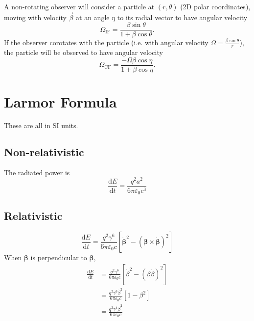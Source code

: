 \documentclass{book}
\newcommand{\deriv}[2]{\frac{\text{d}{#1}}{\text{d}{#2}}}
\begin{document}
A non-rotating observer will consider a particle at $(r,\theta)$ (2D polar coordinates), moving with velocity $\vec{\beta}$ at an angle $\eta$ to its radial vector to have angular velocity
\begin{equation}
    \Omega_\text{IF} = \frac{\beta\sin\theta}{1 + \beta\cos\theta}.
    \label{eqn:angular_rate_IF}
\end{equation}
If the observer corotates with the particle (i.e. with angular velocity $\Omega = \frac{\beta\sin\theta}{r}$), the particle will be observed to have angular velocity
\begin{equation}
    \Omega_\text{CF} = \frac{-\Omega\beta\cos\eta}{1+\beta\cos\eta}.
    \label{eqn:angular_rate_CF}
\end{equation}

\section{Larmor Formula}

These are all in SI units.

\subsection{Non-relativistic}

The radiated power is
\begin{equation}
    \deriv{E}{t} = \frac{q^2a^2}{6\pi\varepsilon_0 c^3}
\end{equation}

\subsection{Relativistic}

\begin{equation}
    \deriv{E}{t} = \frac{q^2\gamma^6}{6\pi\varepsilon_0 c}
        \left[\dot{\bm{\beta}}^2 - (\bm{\beta}\times\dot{\bm{\beta}})^2\right]
\end{equation}
When $\bm{\beta}$ is perpendicular to $\dot{\bm{\beta}}$,
\begin{equation}
\begin{aligned}
    \deriv{E}{t}
        &= \frac{q^2\gamma^6}{6\pi\varepsilon_0 c}
            \left[\dot{\beta}^2 - (\beta\dot{\beta})^2\right] \\
        &= \frac{q^2\gamma^6\dot{\beta}^2}{6\pi\varepsilon_0 c}
            \left[1 - \beta^2\right] \\
        &= \frac{q^2\gamma^4\dot{\beta}^2}{6\pi\varepsilon_0 c}
\end{aligned}
\end{equation}
\end{document}
